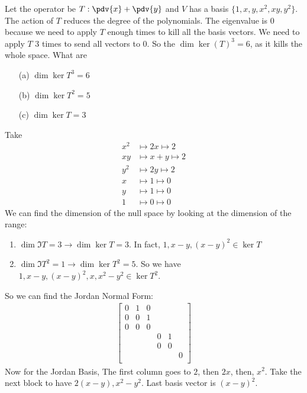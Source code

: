 \documentclass{article}
\begin{document}
\begin{examples}[frametitle={Examples}]
\begin{enumerate}
			Let the operator be $T : \pdv{x} + \pdv{y}$ and $V$ has a basis $\{1, x, y, x^{2}, xy, y^{2}\}$. The action of $T$ reduces the degree of the polynomials. The eigenvalue is 0 because we need to apply $T$ enough times to kill all the basis vectors. We need to apply $T$ 3 times to send all vectors to 0. So the $\dim{\ker{(T)^{3}}} = 6$, as it kills the whole space. What are
			\begin{enumerate}
				\item [(a)] $\dim{\ker{T^{3}}} = 6$ 

				\item [(b)] $\dim{\ker{T^{2}}} = 5$

				\item [(c)] $\dim{\ker{T}} = 3$
			\end{enumerate}
			Take
			\begin{align*}
				x^{2} &\mapsto 2x \mapsto 2\\
				xy &\mapsto x + y \mapsto 2\\
				y^{2} &\mapsto 2y \mapsto 2\\
				x &\mapsto 1 \mapsto 0\\
				y &\mapsto 1 \mapsto 0\\
				1 &\mapsto 0 \mapsto 0   
			\end{align*}
			We can find the dimension of the null space by looking at the dimension of the range:

			\begin{enumerate}
				\item $\dim{\Im{T}} = 3 \rightarrow \dim{\ker{T}} = 3$. In fact, $1, x - y, (x - y)^{2} \in \ker{T}$

				\item $\dim{\Im{T^{2}}} = 1 \rightarrow \dim{\ker{T^{2}}} = 5$. So we have $1, x - y, (x - y)^{2}, x, x^{2} - y^{2} \in \ker{T^{2}}$.
			\end{enumerate}
			So we can find the Jordan Normal Form:
			\begin{align*}
				\begin{bmatrix}
					0 & 1 & 0 &   &   &   \\
					0 & 0 & 1 &   &   &   \\
					0 & 0 & 0 &   &   &   \\
					  &   &   & 0 & 1 &   \\
					  &   &   & 0 & 0 &   \\
					  &   &   &   &   & 0 \\
				\end{bmatrix}
			\end{align*}
			Now for the Jordan Basis, The first column goes to $2$, then $2x$, then, $x^{2}$. Take the next block to have $2(x - y),x^{2} - y^{2}$. Last basis vector is $(x - y)^{2}$.

	\end{enumerate}
\end{examples}
\end{document}
